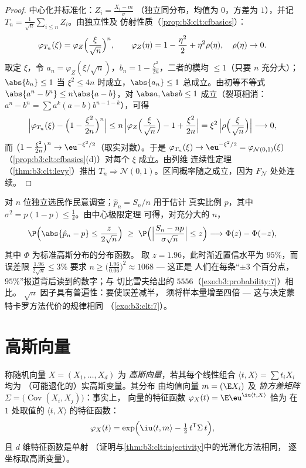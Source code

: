 \begin{proof}
中心化并标准化：$Z_i = \frac{X_i - m}{\sigma}$
（独立同分布，均值为 $0$，方差为 $1$），并记 $T_n =
\frac1{\sqrt n}\sum_{i\leq n}Z_i$。由独立性及
仿射性质（\cref{prop:b3:clt:cfbasics}）：
\[
\varphi_{T_n}(\xi) =
\varphi_{Z}\Bigl(\frac{\xi}{\sqrt n}\Bigr)^{n},
\qquad
\varphi_Z(\eta) = 1 - \frac{\eta^2}2 + \eta^2\rho(\eta),\quad
\rho(\eta)\to0 .
\]
取定 $\xi$，令 $a_n = \varphi_Z(\xi/\sqrt n)$，$b_n = 1 -
\frac{\xi^2}{2n}$，二者的模均 $\leq 1$（只要 $n$ 充分大）；
$\abs{b_n} \leq 1$ 当 $\xi^2 \leq 4n$ 时成立，$\abs{a_n} \leq 1$
总成立。由初等不等式 $\abs{a^n - b^n} \leq
n\abs{a - b}$，对 $\abs a, \abs b \leq 1$ 成立（裂项相消：
$a^n - b^n = \sum a^k(a - b)b^{n-1-k}$），可得
\[
\Bigl|\varphi_{T_n}(\xi) - \Bigl(1 -
\frac{\xi^2}{2n}\Bigr)^{n}\Bigr|
\leq n\,\Bigl|\varphi_Z\Bigl(\frac\xi{\sqrt n}\Bigr) - 1 +
\frac{\xi^2}{2n}\Bigr|
= \xi^2\,\Bigl|\rho\Bigl(\frac{\xi}{\sqrt n}\Bigr)\Bigr|
\longrightarrow 0,
\]
而 $\bigl(1 - \frac{\xi^2}{2n}\bigr)^n \to
\eu^{-\xi^2/2}$（取实对数）。于是 $\varphi_{T_n}(\xi) \to
\eu^{-\xi^2/2} = \varphi_{\mathcal N(0,1)}(\xi)$
（\cref{prop:b3:clt:cfbasics}(d)）对每个 $\xi$ 成立。由列维
连续性定理（\cref{thm:b3:clt:levy}）推出 $T_n \Rightarrow \mathcal
N(0,1)$。区间概率随之成立，因为 $F_{\mathcal
N}$ 处处连续。
\end{proof}

\begin{example}
\label{ex:b3:clt:confidence}
对 $n$ 位独立选民作民意调查；$\hat p_n = S_n/n$ 用于估计
真实比例 $p$，其中 $\sigma^2 = p(1-p) \leq \frac14$。由中心极限定理
可得，对充分大的 $n$，
\[
\P\Bigl(\abs{\hat p_n - p} \leq
\frac{z}{2\sqrt n}\Bigr)
\;\geq\; \P\Bigl(\Bigl|\frac{S_n - np}{\sigma\sqrt n}\Bigr|
\leq z\Bigr)
\longrightarrow \Phi(z) - \Phi(-z),
\]
其中 $\Phi$ 为标准高斯分布的分布函数。
取 $z = 1.96$，此时渐近置信水平为 $95\%$，而
误差限 $\frac{1.96}{2\sqrt n} \leq 3\%$ 要求 $n \geq
\bigl(\frac{1.96}{0.06}\bigr)^2 \approx 1068$ --- 这正是
人们在每条“$\pm3$ 个百分点，$95\%$”报道背后读到的数字；与
切比雪夫给出的 $5556$（\cref{exo:b3:probability:7}）相比。
$\sqrt n$ 因子具有普遍性：要使误差减半，
须将样本量增至四倍 --- 这与决定蒙特卡罗方法代价的规律相同
（\cref{exo:b3:clt:7}）。
\end{example}

\section{高斯向量}

\begin{definition}\label{def:b3:clt:gaussianvector}
称随机向量 $X = (X_1, \dots, X_d)$ 为
\emph{高斯向量}，若其每个线性组合
$\langle t, X\rangle = \sum t_iX_i$ 均为
（可能退化的）实高斯变量。其分布
由均值向量 $m = (\E X_i)$ 及
\emph{协方差矩阵} $\Sigma = \bigl(\operatorname{Cov}
(X_i, X_j)\bigr)$：事实上，
向量的特征函数 $\varphi_X(t) = \E\eu^{\iu\langle t, X\rangle}$ 恰为
在 $1$ 处取值的 $\langle t, X\rangle$ 的特征函数：
\[
\varphi_X(t) = \exp\Bigl(\iu\langle t, m\rangle -
\tfrac12\,t^{\mathsf T}\Sigma\,t\Bigr),
\]
且 $d$ 维特征函数是单射
（证明与\cref{thm:b3:clt:injectivity}中的光滑化方法相同，
逐坐标取高斯变量）。
\end{definition}

